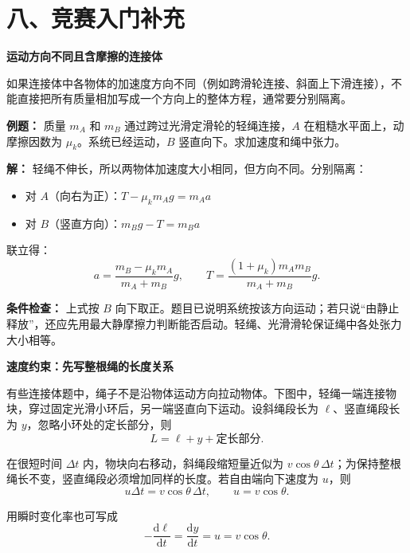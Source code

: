 \section*{八、竞赛入门补充}

\begin{competitionbox}
\textbf{运动方向不同且含摩擦的连接体}

如果连接体中各物体的加速度方向不同（例如跨滑轮连接、斜面上下滑连接），不能直接把所有质量相加写成一个方向上的整体方程，通常要分别隔离。

\textbf{例题：} 质量 $m_A$ 和 $m_B$ 通过跨过光滑定滑轮的轻绳连接，$A$ 在粗糙水平面上，动摩擦因数为 $\mu_k$。系统已经运动，$B$ 竖直向下。求加速度和绳中张力。

\begin{center}


\label{fig:pulley-connected-dynamics}
\end{center}

\textbf{解：} 轻绳不伸长，所以两物体加速度大小相同，但方向不同。分别隔离：
\begin{itemize}
  \item 对 $A$（向右为正）：$T-\mu_km_Ag=m_Aa$
  \item 对 $B$（竖直方向）：$m_B g - T = m_B a$
\end{itemize}

联立得：
\[
a=\frac{m_B-\mu_km_A}{m_A+m_B}g,
\qquad
T=\frac{(1+\mu_k)m_Am_B}{m_A+m_B}g.
\]

\textbf{条件检查：} 上式按 $B$ 向下取正。题目已说明系统按该方向运动；若只说“由静止释放”，还应先用最大静摩擦力判断能否启动。轻绳、光滑滑轮保证绳中各处张力大小相等。
\end{competitionbox}

\begin{competitionbox}
\textbf{速度约束：先写整根绳的长度关系}

有些连接体题中，绳子不是沿物体运动方向拉动物体。下图中，轻绳一端连接物块，穿过固定光滑小环后，另一端竖直向下运动。设斜绳段长为 $\ell$、竖直绳段长为 $y$，忽略小环处的定长部分，则
\[
L=\ell+y+\text{定长部分}.
\]

\begin{center}


\label{fig:rope-velocity-projection}
\end{center}

在很短时间 $\Delta t$ 内，物块向右移动，斜绳段缩短量近似为
$v\cos\theta\,\Delta t$；为保持整根绳长不变，竖直绳段必须增加同样的长度。若自由端向下速度为 $u$，则
\[
u\Delta t=v\cos\theta\,\Delta t,
\qquad
\boxed{u=v\cos\theta}.
\]

用瞬时变化率也可写成
\[
-\frac{\mathrm d\ell}{\mathrm dt}
=\frac{\mathrm dy}{\mathrm dt}
=u=v\cos\theta.
\]
\end{competitionbox}

